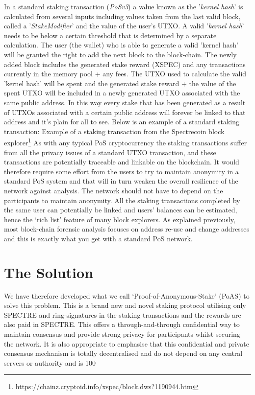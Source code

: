 In a standard staking transaction (\textit{PoSv3}) a value known as the '\textit{kernel hash}' is calculated from several inputs including values taken from the last valid block, called a '\textit{StakeModifier}' and the value of the user's UTXO. A valid '\textit{kernel hash}' needs to be below a certain threshold that is determined by a separate calculation. The user (the wallet) who is able to generate a valid 'kernel hash' will be granted the right to add the next block to the block-chain. The newly added block includes the generated stake reward (XSPEC) and any transactions currently in the memory pool + any fees. The UTXO used to calculate the valid 'kernel hash' will be spent and the generated stake reward + the value of the spent UTXO will be included in a newly generated UTXO associated with the same public address. In this way every stake that has been generated as a result of UTXOs associated with a certain public address will forever be linked to that address and it's plain for all to see. Below is an example of a standard staking transaction: Example of a staking transaction from the Spectrecoin block explorer\footnote{https://chainz.cryptoid.info/xspec/block.dws?1190944.htm} As with any typical PoS cryptocurrency the staking transactions suffer from all the privacy issues of a standard UTXO transaction, and these transactions are potentially traceable and linkable on the blockchain. It would therefore require some effort from the users to try to maintain anonymity in a standard PoS system and that will in turn weaken the overall resilience of the network against analysis. The network should not have to depend on the participants to maintain anonymity. All the staking transactions completed by the same user can potentially be linked and users’ balances can be estimated, hence the ‘rich list’ feature of many block explorers. As explained previously, most block-chain forensic analysis focuses on address re-use and change addresses and this is exactly what you get with a standard PoS network.



\section{The Solution}
We have therefore developed what we call ‘Proof-of-Anonymous-Stake’ (PoAS) to solve this problem. This is a brand new and novel staking protocol utilising only SPECTRE and ring-signatures in the staking transactions and the rewards are also paid in SPECTRE. This offers a through-and-through confidential way to maintain consensus and provide strong privacy for participants whilst securing the network. It is also appropriate to emphasise that this confidential and private consensus mechanism is totally decentralised and do not depend on any central servers or authority and is 100%




